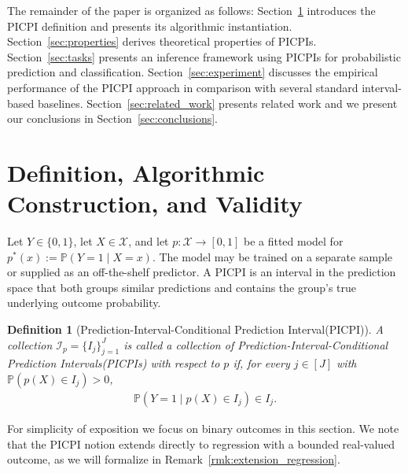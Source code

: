 \documentclass[11pt]{article}
\theoremstyle{statplain}
\theoremstyle{statdefinition}
\newtheorem{definition}[theorem]{Definition}
\newcommand{\PP}{\mathbb{P}}
\newcommand{\0}{\mathbf{0}}
\newcommand{\I}{\mathcal{I}}
\newcommand{\X}{\mathcal{X}}
\newcommand{\interval}{I} %
\newcommand{\intervalset}{\I} %
\newcommand{\titleName}{Prediction-Interval-Conditional Prediction Interval\xspace}
\newcommand{\titleShort}{PICPI\xspace}
\newcommand{\titleNames}{Prediction-Interval-Conditional Prediction Intervals\xspace}
\newcommand{\titleShorts}{PICPIs\xspace}
\begin{document}
The remainder of the paper is organized as follows: Section~\ref{sec:def-alg} introduces the \titleShort definition and presents its algorithmic instantiation.  
Section~\ref{sec:properties} derives theoretical properties of \titleShorts. 
Section~\ref{sec:tasks} presents an inference framework using \titleShorts for probabilistic prediction and classification. 
Section~\ref{sec:experiment} discusses the empirical performance of the \titleShort approach in comparison with several standard interval-based baselines.
Section~\ref{sec:related_work} presents related work and we present our conclusions in Section~\ref{sec:conclusions}.



\section{Definition, Algorithmic Construction, and Validity}\label{sec:def-alg}

Let $Y\in\{0,1\}$, let $X\in\X$, and let $p:\X\to[0,1]$ be a fitted
model for $p^*(x):=\PP(Y=1\mid X=x)$. The model may be trained on a separate sample or supplied as an
off-the-shelf predictor.  A PICPI is an interval in the prediction space that both groups similar predictions and contains the
group's true underlying outcome probability.

\begin{definition}[\titleName (\titleShort)]\label{def:picpi}
A collection $\intervalset_p=\{\interval_j\}_{j=1}^{J}$ is called a
collection of \emph{\titleNames (\titleShorts)} with respect to $p$ if,
for every $j\in[J]$ with $\PP(p(X)\in\interval_j)>0$,
\begin{align}
\PP(Y=1\mid p(X)\in\interval_j)\in\interval_j.
\label{eq:picpi-definition}
\end{align}
\end{definition}

For simplicity of exposition we focus on binary outcomes in this section. We note that the \titleShort notion extends directly to regression with a bounded real-valued
outcome, as we will formalize in Remark~\ref{rmk:extension_regression}.


\end{document}
